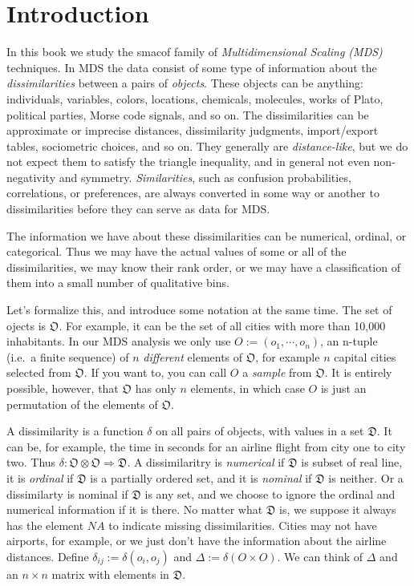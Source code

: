 \documentclass[
  12pt,
  letterpaper,
  DIV=11,
  numbers=noendperiod]{scrreprt}
\theoremstyle{remark}
\begin{document}

\chapter{Introduction}\label{intro}

In this book we study the smacof family of \emph{Multidimensional
Scaling (MDS)} techniques. In MDS the data consist of some type of
information about the \emph{dissimilarities} between a pairs of
\emph{objects}. These objects can be anything: individuals, variables,
colors, locations, chemicals, molecules, works of Plato, political
parties, Morse code signals, and so on. The dissimilarities can be
approximate or imprecise distances, dissimilarity judgments,
import/export tables, sociometric choices, and so on. They generally are
\emph{distance-like}, but we do not expect them to satisfy the triangle
inequality, and in general not even non-negativity and symmetry.
\emph{Similarities}, such as confusion probabilities, correlations, or
preferences, are always converted in some way or another to
dissimilarities before they can serve as data for MDS.

The information we have about these dissimilarities can be numerical,
ordinal, or categorical. Thus we may have the actual values of some or
all of the dissimilarities, we may know their rank order, or we may have
a classification of them into a small number of qualitative bins.

Let's formalize this, and introduce some notation at the same time. The
set of ojects is \(\mathfrak{O}\). For example, it can be the set of all
cities with more than 10,000 inhabitants. In our MDS analysis we only
use \(O:=(o_1,\cdots,o_n)\), an n-tuple (i.e.~a finite sequence) of
\(n\) \emph{different} elements of \(\mathfrak{O}\), for example \(n\)
capital cities selected from \(\mathfrak{O}\). If you want to, you can
call \(O\) a \emph{sample} from \(\mathfrak{O}\). It is entirely
possible, however, that \(\mathfrak{O}\) has only \(n\) elements, in
which case \(O\) is just an permutation of the elements of
\(\mathfrak{O}\).

A dissimilarity is a function \(\delta\) on all pairs of objects, with
values in a set \(\mathfrak{D}\). It can be, for example, the time in
seconds for an airline flight from city one to city two. Thus
\(\delta:\mathfrak{O}\otimes\mathfrak{O}\Rightarrow\mathfrak{D}\). A
dissimilaritry is \emph{numerical} if \(\mathfrak{D}\) is subset of real
line, it is \emph{ordinal} if \(\mathfrak{D}\) is a partially ordered
set, and it is \emph{nominal} if \(\mathfrak{D}\) is neither. Or a
dissimilarty is nominal if \(\mathfrak{D}\) is any set, and we choose to
ignore the ordinal and numerical information if it is there. No matter
what \(\mathfrak{D}\) is, we suppose it always has the element
\(\mathit{NA}\) to indicate missing dissimilarities. Cities may not have
airports, for example, or we just don't have the information about the
airline distances. Define \(\delta_{ij}:=\delta(o_i,o_j)\) and
\(\Delta:=\delta(O\times O)\). We can think of \(\Delta\) and an
\(n\times n\) matrix with elements in \(\mathfrak{D}\).
\end{document}

